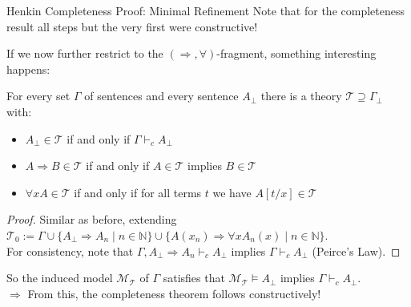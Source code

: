 \documentclass[xcolor=dvipsnames,aspectratio=169,handout]{beamer}
\renewcommand{\to}{\Rightarrow}
\newcommand{\TT}{\mathcal{T}}
\newcommand{\MM}{\mathcal{M}}
\begin{document}
\begin{frame}{Henkin Completeness Proof: Minimal Refinement}
	Note that for the completeness result all steps but the very first were constructive!
	\pause
	
	If we now further restrict to the $(\to,\forall)$-fragment, something interesting happens:
	\pause
	\begin{lemma}[Lindenbaum]
		For every set $\Gamma$ of sentences and every sentence $A_\bot$ there is a theory $\TT\supseteq \Gamma_\bot$ with:
		\begin{itemize}
			\item
			$A_\bot \in \TT$ if and only if $\Gamma\vdash_c A_\bot$
			\item
			$A\to B\in \TT$ if and only if $A\in \TT$ implies $B\in \TT$
			\item
			$\forall x A\in \TT$ if and only if for all terms $t$ we have $A[t/x]\in \TT$
		\end{itemize}
	\end{lemma}
		
		\pause
		\begin{proof}
			\pause
			Similar as before, extending $\textstyle \TT_0 := \Gamma\cup \{A_\bot{\to} A_n\mid n\in \mathbb N \} \cup \{A(x_n){\to} \forall xA_n(x)\mid n\in \mathbb{N}\}$.\\
			For consistency, note that $\Gamma, A_\bot{\to} A_n\vdash_c A_\bot$ implies $\Gamma\vdash_c A_\bot$ (Peirce's Law).
		\end{proof}
		
	\pause
	\vspace{0.3cm}
	So the induced model $\MM_\TT$ of $\Gamma$ satisfies that $\MM_\TT\vDash A_\bot$ implies $\Gamma\vdash_c A_\bot$.\\
	\pause
	$\Rightarrow$ From this, the completeness theorem follows constructively!
\end{frame}
\end{document}
